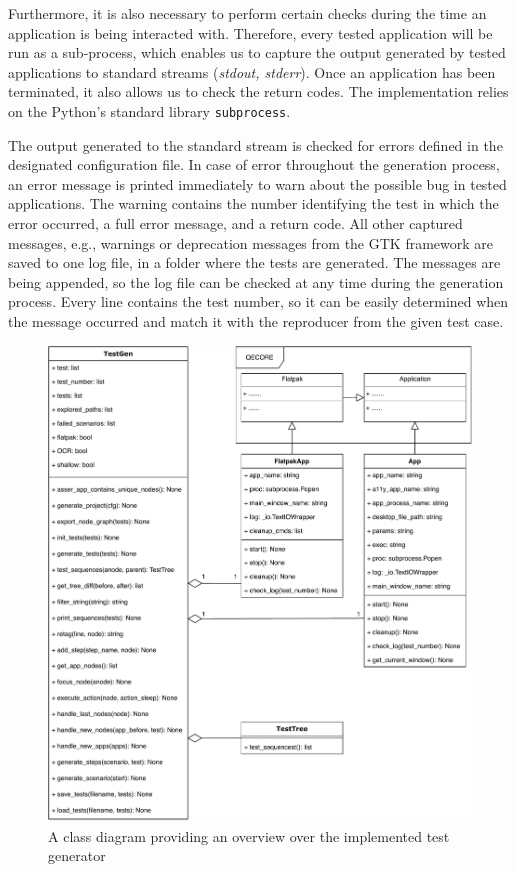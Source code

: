 Furthermore, it is also necessary to perform certain checks during the time an application is being interacted with. Therefore, every tested application will be run as a sub-process, which enables us to capture the output generated by tested applications to standard streams (\textit{stdout, stderr}). Once an application has been terminated, it also allows us to check the return codes. The implementation relies on the Python's standard library \texttt{subprocess}. 

The output generated to the standard stream is checked for errors defined in the designated configuration file. In case of error throughout the generation process, an error message is printed immediately to warn about the possible bug in tested applications. The warning contains the number identifying the test in which the error occurred, a full error message, and a return code. All other captured messages, e.g., warnings or deprecation messages from the GTK framework are saved to one log file, in a folder where the tests are generated. The messages are being appended, so the log file can be checked at any time during the generation process. Every line contains the test number, so it can be easily determined when the message occurred and match it with the reproducer from the given test case.

\begin{figure}[H]
	\centering
	\includegraphics[width=1\textwidth,clip]{obrazky-figures/TestGen_class_diagram.pdf}
	\caption{A class diagram providing an overview over the implemented test generator}
	\label{test_gen}
\end{figure}

